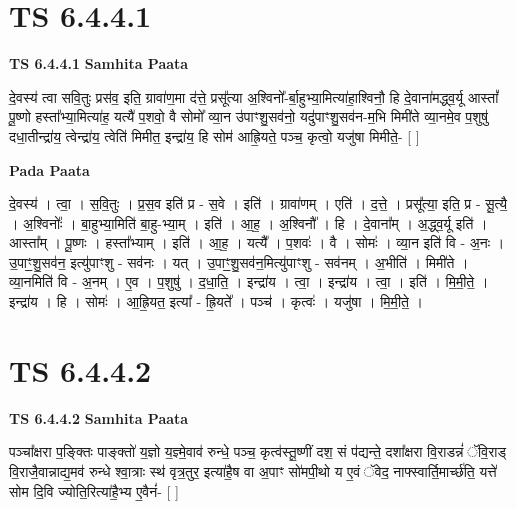\documentclass[17pt]{extarticle}
\begin{document}

\section{ TS 6.4.4.1 }

\textbf{TS 6.4.4.1 } \newline
\textbf{Samhita Paata} \newline

दे॒वस्य॑ त्वा सवि॒तुः प्रस॑व॒ इति॒ ग्रावा॑ण॒मा द॑त्ते॒ प्रसू᳚त्या अ॒श्विनो᳚-र्बा॒हुभ्या॒मित्या॑हा॒श्विनौ॒ हि दे॒वाना॑मद्ध्व॒र्यू आस्तां᳚ पू॒ष्णो हस्ता᳚भ्या॒मित्या॑ह॒ यत्यै॑ प॒शवो॒ वै सोमो᳚ व्या॒न उ॑पाꣳशु॒सव॑नो॒ यदु॑पाꣳशु॒सव॑न-म॒भि मिमी॑ते व्या॒नमे॒व प॒शुषु॑ दधा॒तीन्द्रा॑य॒ त्वेन्द्रा॑य॒ त्वेति॑ मिमीत॒ इन्द्रा॑य॒ हि सोम॑ आह्रि॒यते॒ पञ्च॒ कृत्वो॒ यजु॑षा मिमीते॒- [  ] \newline

\textbf{Pada Paata} \newline

दे॒वस्य॑ । त्वा॒ । स॒वि॒तुः । प्र॒स॒व इति॑ प्र - स॒वे । इति॑ । ग्रावा॑णम् । एति॑ । द॒त्ते॒ । प्रसू᳚त्या॒ इति॒ प्र - सू॒त्यै॒ । अ॒श्विनोः᳚ । बा॒हुभ्या॒मिति॑ बा॒हु-भ्या॒म् । इति॑ । आ॒ह॒ । अ॒श्विनौ᳚ । हि । दे॒वाना᳚म् । अ॒द्ध्व॒र्यू इति॑ । आस्ता᳚म् । पू॒ष्णः । हस्ता᳚भ्याम् । इति॑ । आ॒ह॒ । यत्यै᳚ । प॒शवः॑ । वै । सोमः॑ । व्या॒न इति॑ वि - अ॒नः । उ॒पाꣳ॒॒शु॒सव॑न॒ इत्यु॑पाꣳशु - सव॑नः । यत् । उ॒पाꣳ॒॒शु॒सव॑न॒मित्यु॑पाꣳशु - सव॑नम् । अ॒भीति॑ । मिमी॑ते । व्या॒नमिति॑ वि - अ॒नम् । ए॒व । प॒शुषु॑ । द॒धा॒ति॒ । इन्द्रा॑य । त्वा॒ । इन्द्रा॑य । त्वा॒ । इति॑ । मि॒मी॒ते॒ । इन्द्रा॑य । हि । सोमः॑ । आ॒ह्रि॒यत॒ इत्या᳚ - ह्रि॒यते᳚ । पञ्च॑ । कृत्वः॑ । यजु॑षा । मि॒मी॒ते॒ ।  \newline





\section{ TS 6.4.4.2 }

\textbf{TS 6.4.4.2 } \newline
\textbf{Samhita Paata} \newline

पञ्चा᳚क्षरा प॒ङ्क्तिः पाङ्क्तो॑ य॒ज्ञो य॒ज्ञ्मे॒वाव॑ रुन्धे॒ पञ्च॒ कृत्व॑स्तू॒ष्णीं दश॒ सं प॑द्यन्ते॒ दशा᳚क्षरा वि॒राडन्नं॑ ॅवि॒राड् वि॒राजै॒वान्नाद्य॒मव॑ रुन्धे श्वा॒त्राः स्थ॑ वृत्र॒तुर॒ इत्या॑है॒ष वा अ॒पाꣳ सो॑मपी॒थो य ए॒वं ॅवेद॒ नाफ्स्वार्ति॒मार्च्छ॑ति॒ यत्ते॑ सोम दि॒वि ज्योति॒रित्या॑है॒भ्य ए॒वैनं॑- [  ] \newline
\end{document}
